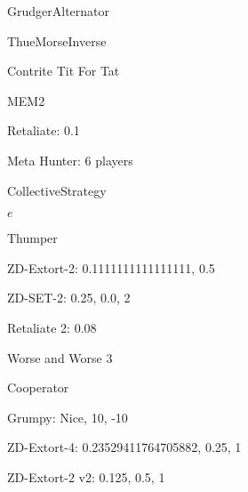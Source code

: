 \item GrudgerAlternator
\item ThueMorseInverse
\item Contrite Tit For Tat
\item MEM2
\item Retaliate: 0.1
\item Meta Hunter: 6 players
\item CollectiveStrategy
\item $e$
\item Thumper
\item ZD-Extort-2: 0.1111111111111111, 0.5
\item ZD-SET-2: 0.25, 0.0, 2
\item Retaliate 2: 0.08
\item Worse and Worse 3
\item Cooperator
\item Grumpy: Nice, 10, -10
\item ZD-Extort-4: 0.23529411764705882, 0.25, 1
\item ZD-Extort-2 v2: 0.125, 0.5, 1
